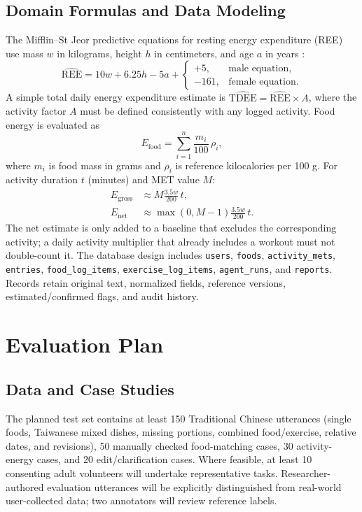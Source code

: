 \documentclass[journal,10pt]{IEEEtran}
\begin{document}
\subsection{Domain Formulas and Data Modeling}
The Mifflin--St Jeor predictive equations for resting energy expenditure (REE) use mass $w$ in kilograms, height $h$ in centimeters, and age $a$ in years \cite{mifflin}:
\begin{equation}
\widehat{\mathrm{REE}}=10w+6.25h-5a+\begin{cases}+5,&\text{male equation},\\-161,&\text{female equation}.\end{cases}
\label{eq:ree}
\end{equation}
A simple total daily energy expenditure estimate is $\widehat{\mathrm{TDEE}}=\widehat{\mathrm{REE}}\times A$, where the activity factor $A$ must be defined consistently with any logged activity. Food energy is evaluated as
\begin{equation}
E_{\mathrm{food}}=\sum_{i=1}^{n}\frac{m_i}{100}\,\rho_i,
\label{eq:food}
\end{equation}
where $m_i$ is food mass in grams and $\rho_i$ is reference kilocalories per 100 g. For activity duration $t$ (minutes) and MET value $M$:
\begin{align}
E_{\mathrm{gross}}&\approx M\frac{3.5w}{200}\,t,\\
E_{\mathrm{net}}&\approx\max(0,M-1)\frac{3.5w}{200}\,t.
\label{eq:met}
\end{align}
The net estimate is only added to a baseline that excludes the corresponding activity; a daily activity multiplier that already includes a workout must not double-count it. The database design includes \texttt{users}, \texttt{foods}, \texttt{activity\_mets}, \texttt{entries}, \texttt{food\_log\_items}, \texttt{exercise\_log\_items}, \texttt{agent\_runs}, and \texttt{reports}. Records retain original text, normalized fields, reference versions, estimated/confirmed flags, and audit history.

\section{Evaluation Plan}
\subsection{Data and Case Studies}
The planned test set contains at least 150 Traditional Chinese utterances (single foods, Taiwanese mixed dishes, missing portions, combined food/exercise, relative dates, and revisions), 50 manually checked food-matching cases, 30 activity-energy cases, and 20 edit/clarification cases. Where feasible, at least 10 consenting adult volunteers will undertake representative tasks. Researcher-authored evaluation utterances will be explicitly distinguished from real-world user-collected data; two annotators will review reference labels.
\end{document}
